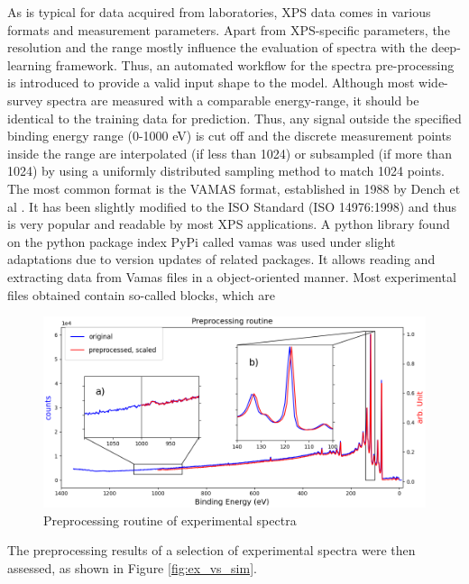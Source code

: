 As is typical for data acquired from laboratories, XPS data comes in various formats and measurement parameters. Apart from XPS-specific parameters, the resolution and the range mostly influence the evaluation of spectra with the deep-learning framework. Thus, an automated workflow for the spectra pre-processing is introduced to provide a valid input shape to the model.
Although most wide-survey spectra are measured with a comparable energy-range, it should be identical to the training data for prediction. Thus, any signal outside the specified binding energy range (0-1000 eV) is cut off and the discrete measurement points inside the range are interpolated (if less than 1024) or subsampled (if more than 1024) by using a uniformly distributed sampling method to match 1024 points.
The most common format is the VAMAS format, established in 1988 by Dench et al \cite{dench_vamas_1988}. It has been slightly modified to the ISO Standard \cite{1400-1700_iso_nodate}(ISO 14976:1998) and thus is very popular and readable by most XPS applications. A python library found on the python package index PyPi called vamas \cite{krinninger_vamas_nodate} was used under slight adaptations due to version updates of related packages. It allows reading and extracting data from Vamas files in a object-oriented manner.
Most experimental files obtained contain so-called blocks, which are 

\begin{figure}
    \centering
    \includegraphics[width=\textwidth]{Figures/preprocessing_routine.png}
    \caption{Preprocessing routine of experimental spectra}
    \label{fig:preproc_routine}
\end{figure}

The preprocessing results of a selection of experimental spectra were then assessed, as shown in Figure \ref{fig:ex_vs_sim}.

